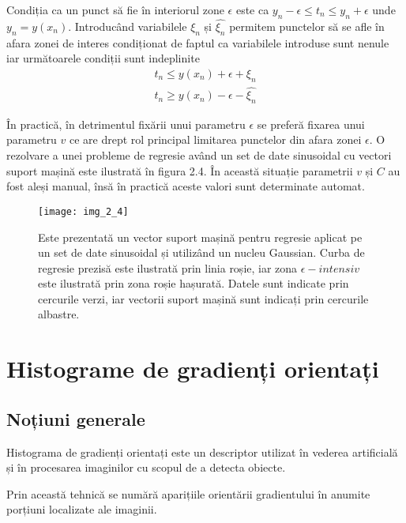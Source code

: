 Condiția ca un punct să fie în interiorul zone $ \epsilon $ este ca $y_n - \epsilon \leq t_n \leq y_n + \epsilon$ unde $y_n = y(x_n)$. Introducând variabilele $\xi_n$ și $\widehat{\xi_n}$ permitem punctelor să se afle în afara zonei de interes condiționat de faptul ca variabilele introduse sunt nenule iar următoarele condiții sunt indeplinite
\begin{align}	
	t_n \leq y(x_n) + \epsilon + \xi_n
\end{align}
\begin{align}	
	t_n \geq y(x_n) - \epsilon - \widehat{\xi_n}
\end{align}

În practică, în detrimentul fixării unui parametru $\epsilon$ se preferă fixarea unui parametru $v$ ce are drept rol principal limitarea punctelor din afara zonei $\epsilon$. O rezolvare a unei probleme de regresie având un set de date sinusoidal cu vectori suport mașină este ilustrată în figura 2.4. În această situație parametrii $v$ și $C$ au fost aleși manual, însă în practică aceste valori sunt determinate automat.
\begin{figure}[!h]
	\centering
	\texttt{[image: img\_2\_4]}
	\caption[Vector suport mașină regresie 3]{Este prezentată un vector suport mașină pentru regresie aplicat pe un set de date sinusoidal și utilizând un nucleu Gaussian. Curba de regresie prezisă este ilustrată prin linia roșie, iar zona $\epsilon - intensiv$ este ilustrată prin zona roșie hașurată. Datele sunt indicate prin cercurile verzi, iar vectorii suport mașină sunt indicați prin cercurile albastre.}
\end{figure}

\section{Histograme de gradienți orientați}

\subsection{Noțiuni generale}

Histograma de gradienți orientați este un descriptor utilizat în vederea artificială și în procesarea imaginilor cu scopul de a detecta obiecte. 

Prin această tehnică se numără aparițiile orientării gradientului în anumite porțiuni localizate ale imaginii.

